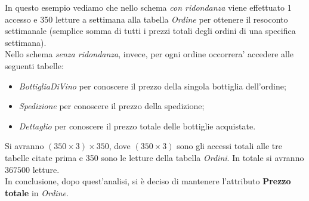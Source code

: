 \begin{flushleft}
In questo esempio vediamo che nello schema \emph{con ridondanza} viene effettuato 1 accesso e 350 letture a settimana alla tabella \emph{Ordine} per ottenere il resoconto settimanale (semplice somma di tutti i prezzi totali degli ordini di una specifica settimana).\\
\vspace{0.5cm}
Nello schema \emph{senza ridondanza}, invece, per ogni ordine occorrera' accedere alle seguenti tabelle:
\begin{itemize}
	\item \emph{BottigliaDiVino} per conoscere il prezzo della singola bottiglia dell'ordine;
	\item \emph{Spedizione} per conoscere il prezzo della spedizione;
	\item \emph{Dettaglio} per conoscere il prezzo totale delle bottiglie acquistate.
\end{itemize}
Si avranno $(350\times3)\times350$, dove $(350\times3)$ sono gli accessi totali alle tre tabelle citate prima e 350 sono le letture della tabella \emph{Ordini}. In totale si avranno $367500$ letture.\\
\vspace{0.5cm}
In conclusione, dopo quest'analisi, si è deciso di mantenere l'attributo \textbf{Prezzo totale} in \emph{Ordine}.
\end{flushleft}
